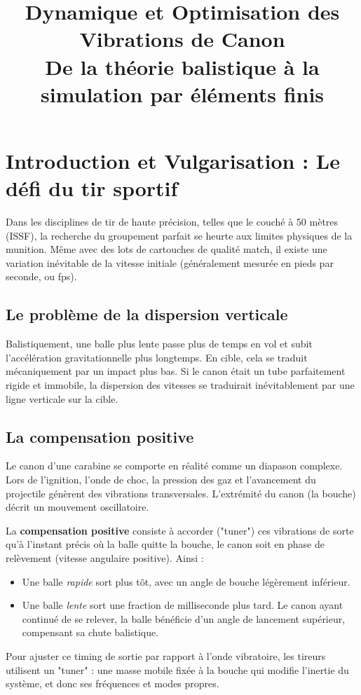 \documentclass[12pt,a4paper]{article}
\title{Dynamique et Optimisation des Vibrations de Canon \\ \large De la théorie balistique à la simulation par éléments finis}
\author{}
\date{}
\begin{document}
	
	\maketitle
	\tableofcontents
	\vspace{1cm}
	
	\section{Introduction et Vulgarisation : Le défi du tir sportif}
	
	Dans les disciplines de tir de haute précision, telles que le couché à 50 mètres (ISSF), la recherche du groupement parfait se heurte aux limites physiques de la munition. Même avec des lots de cartouches de qualité match, il existe une variation inévitable de la vitesse initiale (généralement mesurée en pieds par seconde, ou fps). 
	
	\subsection{Le problème de la dispersion verticale}
	Balistiquement, une balle plus lente passe plus de temps en vol et subit l'accélération gravitationnelle plus longtemps. En cible, cela se traduit mécaniquement par un impact plus bas. Si le canon était un tube parfaitement rigide et immobile, la dispersion des vitesses se traduirait inévitablement par une ligne verticale sur la cible.
	
	\subsection{La compensation positive}
	Le canon d'une carabine se comporte en réalité comme un diapason complexe. Lors de l'ignition, l'onde de choc, la pression des gaz et l'avancement du projectile génèrent des vibrations transversales. L'extrémité du canon (la bouche) décrit un mouvement oscillatoire.
	
	La \textbf{compensation positive} consiste à accorder ("tuner") ces vibrations de sorte qu'à l'instant précis où la balle quitte la bouche, le canon soit en phase de relèvement (vitesse angulaire positive). Ainsi :
	\begin{itemize}
		\item Une balle \textit{rapide} sort plus tôt, avec un angle de bouche légèrement inférieur.
		\item Une balle \textit{lente} sort une fraction de milliseconde plus tard. Le canon ayant continué de se relever, la balle bénéficie d'un angle de lancement supérieur, compensant sa chute balistique.
	\end{itemize}
	Pour ajuster ce timing de sortie par rapport à l'onde vibratoire, les tireurs utilisent un "tuner" : une masse mobile fixée à la bouche qui modifie l'inertie du système, et donc ses fréquences et modes propres.
	
\end{document}
